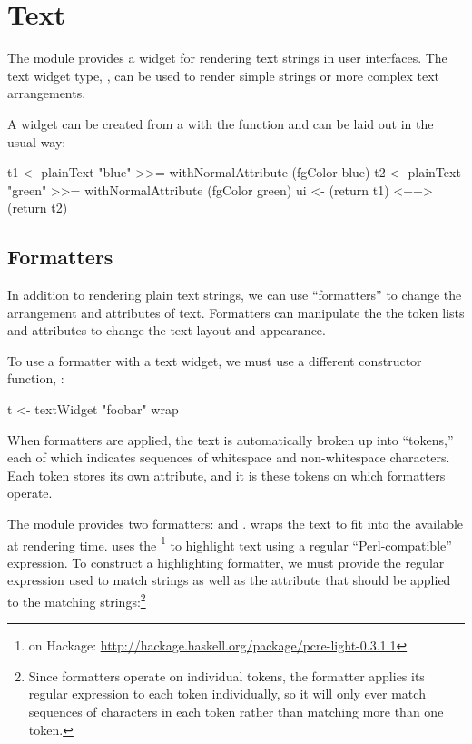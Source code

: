 \section{Text}
\label{sec:text}

The  module provides a widget for rendering text strings in
user interfaces.  The text widget type, , can
be used to render simple strings or more complex text arrangements.

A  widget can be created from a  with the
 function and can be laid out in the usual way:

\begin{haskellcode}
 t1 <- plainText "blue" >>= withNormalAttribute (fgColor blue)
 t2 <- plainText "green" >>= withNormalAttribute (fgColor green)
 ui <- (return t1) <++> (return t2)
\end{haskellcode}

\subsection{Formatters}

In addition to rendering plain text strings, we can use ``formatters''
to change the arrangement and attributes of text.  Formatters can
manipulate the the token lists and attributes to change the text
layout and appearance.

To use a formatter with a text widget, we must use a different
constructor function, :

\begin{haskellcode}
 t <- textWidget "foobar" wrap
\end{haskellcode}

When formatters are applied, the text is automatically broken up into
``tokens,'' each of which indicates sequences of whitespace and
non-whitespace characters.  Each token stores its own attribute, and
it is these tokens on which formatters operate.

The  module provides two formatters:  and
.   wraps the text to fit into the
 available at rendering time.   uses
the \footnote{ on Hackage:
  \href{http://hackage.haskell.org/package/pcre-light-0.3.1.1}{http://hackage.haskell.org/package/pcre-light-0.3.1.1}}
to highlight text using a regular ``Perl-compatible'' expression.  To
construct a highlighting formatter, we must provide the regular
expression used to match strings as well as the attribute that should
be applied to the matching strings:\footnote{Since formatters operate
  on individual tokens, the  formatter applies its
  regular expression to each token individually, so it will only ever
  match sequences of characters in each token rather than matching
  more than one token.}


